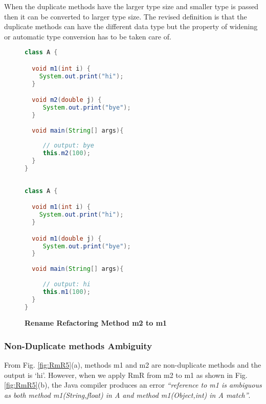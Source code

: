 When the duplicate methods have the larger type size and smaller type is passed then it can be converted to larger type size. The revised definition is that the duplicate methods can have the different data type but the property of widening or automatic type conversion has to be taken care of.

\begin{figure}[th]
\centering
\begin{minipage}[t]{0.47\linewidth}
\begin{lstlisting}[language=java, basicstyle=\scriptsize\ttfamily,frame=single]
class A {

  void m1(int i) {	
    System.out.print("hi");
  }

  void m2(double j) {	
     System.out.print("bye");
  }	
  
  void main(String[] args){
	
     // output: bye
     this.m2(100); 
  }
}
 
\end{lstlisting}
\end{minipage}
\hfill
\begin{minipage}[t]{0.47\linewidth}
\begin{lstlisting}[language=java, basicstyle=\scriptsize\ttfamily,frame=single]
class A {

  void m1(int i) {	
    System.out.print("hi");
  }

  void m1(double j) {	
     System.out.print("bye");
  }	
  
  void main(String[] args){
	
     // output: hi
     this.m1(100); 
  }
}

\end{lstlisting}
\end{minipage}
\caption{\textbf{Rename Refactoring Method m2 to m1}}
\label{fig:RmR4}
\end{figure}

\subsubsection {Non-Duplicate methods Ambiguity} 
From Fig. \ref{fig:RmR5}(a), methods m1 and m2 are non-duplicate methods and the output is `hi'. However, when we apply RmR from m2 to m1 as shown in Fig. \ref{fig:RmR5}(b), the Java compiler produces an error \textsl{``reference to m1 is ambiguous as both method m1(String,float) in A and method m1(Object,int) in A match''}. 

